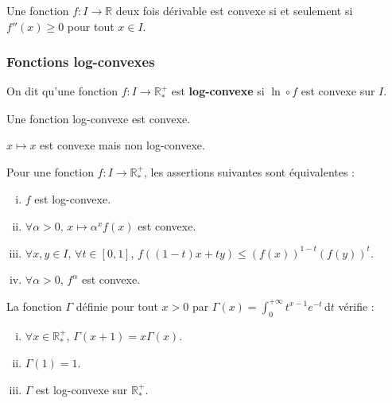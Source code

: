 	\begin{proposition}
		Une fonction $f : I \rightarrow \mathbb{R}$ deux fois dérivable est convexe si et seulement si $f''(x) \geq 0$ pour tout $x \in I$.
	\end{proposition}

	\subsubsection{Fonctions log-convexes}


	\begin{definition}
		On dit qu'une fonction $f : I \rightarrow \mathbb{R}^+_*$ est \textbf{log-convexe} si $\ln \circ f$ est convexe sur $I$.
	\end{definition}

	\begin{proposition}
		Une fonction log-convexe est convexe.
	\end{proposition}

	\begin{cexample}
		$x \mapsto x$ est convexe mais non log-convexe.
	\end{cexample}

	\begin{theorem}
		Pour une fonction $f : I \rightarrow \mathbb{R}^+_*$, les assertions suivantes sont équivalentes :
		\begin{enumerate}[(i)]
			\item $f$ est log-convexe.
			\item $\forall \alpha > 0, \, x \mapsto \alpha^x f(x)$ est convexe.
			\item $\forall x, y \in I, \, \forall t \in [0,1], \, f((1-t)x + ty) \leq (f(x))^{1-t} (f(y))^t$.
			\item $\forall \alpha > 0, \, f^\alpha$ est convexe.
		\end{enumerate}
	\end{theorem}


	\begin{lemma}
		\label{229-1}
		La fonction $\Gamma$ définie pour tout $x > 0$ par $\Gamma(x) = \int_0^{+\infty} t^{x-1} e^{-t} \, \mathrm{d}t$ vérifie :
		\begin{enumerate}[(i)]
			\item $\forall x \in \mathbb{R}^+_*$, $\Gamma(x+1) = x\Gamma(x)$.
			\item $\Gamma(1) = 1$.
			\item $\Gamma$ est log-convexe sur $\mathbb{R}^+_*$.
		\end{enumerate}
	\end{lemma}

